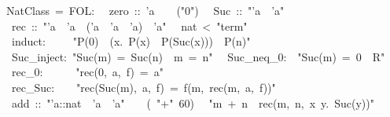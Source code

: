 \begin{isabelle}%
~NatClass~=~FOL:\isanewline
\isanewline
{}\isanewline
~~zero~::~'a~~~~({"}0{"})\isanewline
~~Suc~::~{"}'a~{\isasymRightarrow}~'a{"}\isanewline
~~rec~::~{"}'a~{\isasymRightarrow}~'a~{\isasymRightarrow}~('a~{\isasymRightarrow}~'a~{\isasymRightarrow}~'a)~{\isasymRightarrow}~'a{"}\isanewline
\isanewline
{}\isanewline
~~nat~<~{"}term{"}\isanewline
~~induct:~~~~~{"}P(0)~{\isasymLongrightarrow}~({\isasymAnd}x.~P(x)~{\isasymLongrightarrow}~P(Suc(x)))~{\isasymLongrightarrow}~P(n){"}\isanewline
~~Suc\_inject:~{"}Suc(m)~=~Suc(n)~{\isasymLongrightarrow}~m~=~n{"}\isanewline
~~Suc\_neq\_0:~~{"}Suc(m)~=~0~{\isasymLongrightarrow}~R{"}\isanewline
~~rec\_0:~~~~~~{"}rec(0,~a,~f)~=~a{"}\isanewline
~~rec\_Suc:~~~~{"}rec(Suc(m),~a,~f)~=~f(m,~rec(m,~a,~f)){"}\isanewline
\isanewline
{}\isanewline
~~add~::~{"}'a::nat~{\isasymRightarrow}~'a~{\isasymRightarrow}~'a{"}~~~~(~{"}+{"}~60)\isanewline
~~{"}m~+~n~{\isasymequiv}~rec(m,~n,~{\isasymlambda}x~y.~Suc(y)){"}\isanewline
\isanewline
{}\end{isabelle}%
